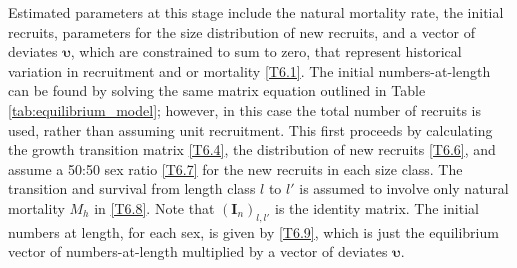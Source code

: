 \documentclass[12pt,letterpaper]{article}
\begin{document}
      Estimated parameters at this stage include the natural mortality rate, the initial recruits, parameters for the size distribution of new recruits, and a vector of deviates $\bm{\upsilon}$, which are constrained to sum to zero, that represent historical variation in recruitment and or mortality \eqref{T6.1}.  The initial numbers-at-length can be found by solving the same matrix equation outlined in Table \ref{tab:equilibrium_model}; however, in this case the total number of recruits is used, rather than assuming unit recruitment.  This first proceeds by calculating the growth transition matrix \eqref{T6.4}, the distribution of new recruits \eqref{T6.6}, and assume a 50:50 sex ratio \eqref{T6.7} for the new recruits in each size class.  The transition and survival from length class $l$ to $l'$ is assumed to involve only natural mortality $M_h$ in \eqref{T6.8}.  Note that $(\bm{I}_n)_{l,l'}$ is the identity matrix.  The initial numbers at length, for each sex, is given by \eqref{T6.9}, which is just the equilibrium vector of numbers-at-length multiplied by a vector of deviates $\bm{\upsilon}$.
\end{document}
